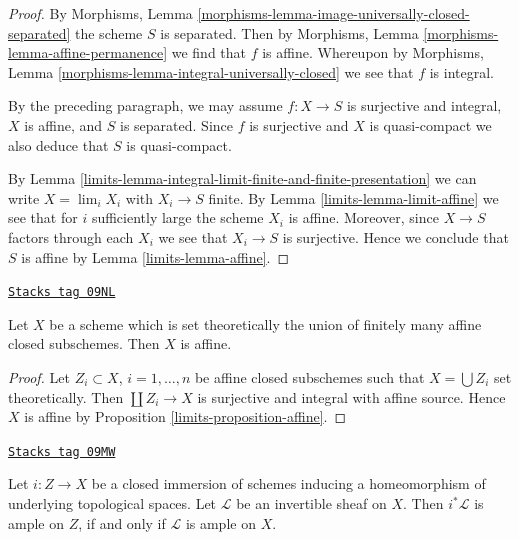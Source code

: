 \begin{proof}

By Morphisms, Lemma \ref{morphisms-lemma-image-universally-closed-separated}
the scheme $S$ is separated. Then by
Morphisms, Lemma \ref{morphisms-lemma-affine-permanence}
we find that $f$ is affine. Whereupon by
Morphisms, Lemma \ref{morphisms-lemma-integral-universally-closed}
we see that $f$ is integral.

\medskip\noindent
By the preceding paragraph, we may assume $f : X \to S$
is surjective and integral, $X$ is affine, and $S$ is separated.
Since $f$ is surjective and $X$ is quasi-compact we also deduce that $S$ is
quasi-compact.

\medskip\noindent
By Lemma \ref{limits-lemma-integral-limit-finite-and-finite-presentation}
we can write $X = \lim_i X_i$ with $X_i \to S$ finite. By
Lemma \ref{limits-lemma-limit-affine}
we see that for $i$ sufficiently large the scheme $X_i$ is affine.
Moreover, since $X \to S$ factors through each $X_i$ we see that
$X_i \to S$ is surjective. Hence we conclude that $S$ is affine by
Lemma \ref{limits-lemma-affine}.
\end{proof}

\begin{lemma}
\label{limits-lemma-affines-glued-in-closed-affine}
\href{https://stacks.math.columbia.edu/tag/09NL}{\texttt{Stacks tag 09NL}}

Let $X$ be a scheme which is set theoretically the union of
finitely many affine closed subschemes. Then $X$ is affine.
\end{lemma}

\begin{proof}

Let $Z_i \subset X$, $i = 1, \ldots, n$ be affine closed subschemes such that
$X = \bigcup Z_i$ set theoretically. Then $\coprod Z_i \to X$ is surjective
and integral with affine source. Hence $X$ is affine by
Proposition \ref{limits-proposition-affine}.
\end{proof}

\begin{lemma}
\label{limits-lemma-ample-on-reduction}
\href{https://stacks.math.columbia.edu/tag/09MW}{\texttt{Stacks tag 09MW}}

Let $i : Z \to X$ be a closed immersion of schemes
inducing a homeomorphism of underlying topological spaces.
Let $\mathcal{L}$ be an invertible sheaf on $X$.
Then $i^*\mathcal{L}$ is ample on $Z$, if and only if $\mathcal{L}$
is ample on $X$.
\end{lemma}

